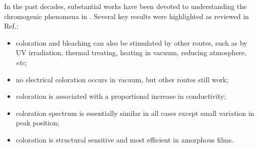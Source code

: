 In the past decades, substantial works have been devoted to understanding the chromogenic phenomena in . Several key results were highlighted as reviewed in Ref.\cite{Deb2008}:
\begin{itemize}
    \item coloration and bleaching can also be stimulated by other routes, such as by UV irradiation, thermal treating, heating in vacuum, reducing atmosphere, \emph{etc};
    \item no electrical coloration occurs in vacuum, but other routes still work;
    \item coloration is associated with a proportional increase in conductivity;
    \item coloration spectrum is essentially similar in all cases except small variation in peak position;
    \item coloration is structural sensitive and most efficient in amorphous films.
\end{itemize}

